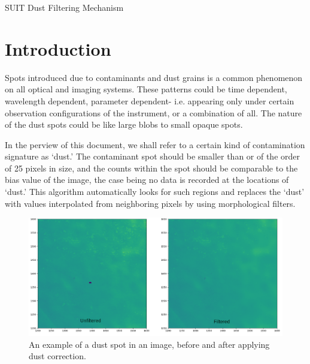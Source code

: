 \documentclass[11pt,a4paper]{article}
\begin{document}
	SUIT Dust Filtering Mechanism
	\section{Introduction}
	Spots introduced due to contaminants and dust grains is a common phenomenon on all optical and imaging systems. These patterns could be time dependent, wavelength dependent, parameter dependent- i.e. appearing only under certain observation configurations of the instrument, or a combination of all. The nature of the dust spots could be like large blobs to small opaque spots. 
	
	In the perview of  this document, we shall refer to a certain kind of contamination signature as `dust.' The contaminant spot should be smaller than or of the order of 25 pixels in size, and the counts within the spot should be comparable to the bias value of the image, the case being no data is recorded at the locations of `dust.' This algorithm automatically looks for such regions and replaces the `dust' with values interpolated from neighboring pixels by using morphological filters.
	
	\begin{figure}
		\centering
		\includegraphics[width=0.7\linewidth]{pics/dust_example}
		\caption{An example of a dust spot in an image, before and after applying dust correction.}
		\label{fig:dustexample}
	\end{figure}
	
\end{document}
